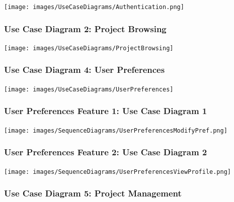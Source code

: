 \documentclass[twoside,letterpaper]{article}
\begin{document}
	\texttt{[image: images/UseCaseDiagrams/Authentication.png]}
	\newpage


	\subsubsection[Use Case Diagram 2: Project Browsing]{\rmfamily\bfseries\color{black}
	Use Case Diagram 2: Project Browsing}
	
	\texttt{[image: images/UseCaseDiagrams/ProjectBrowsing]}
	
	\newpage


	\subsubsection[Use Case Diagram 4: User Preferences]{\rmfamily\bfseries\color{black}
		Use Case Diagram 4: User Preferences}
	
	\bigskip
	
	\texttt{[image: images/UseCaseDiagrams/UserPreferences]}
	
	\newpage
	
	\subsubsection[User Preferences Feature 1: Use Case Diagram 1]{\rmfamily\bfseries\color{black}
		User Preferences Feature 1: Use Case Diagram 1}
	\hypertarget{RefHeading22059017292}{}
	\bigskip
	
	\texttt{[image: images/SequenceDiagrams/UserPreferencesModifyPref.png]}
	
	\newpage
	
	\subsubsection[User Preferences Feature 2: Use Case Diagram 2]{\rmfamily\bfseries\color{black}
		User Preferences Feature 2: Use Case Diagram 2}
	\hypertarget{RefHeading22059017292}{}
	\bigskip
	
	\texttt{[image: images/SequenceDiagrams/UserPreferencesViewProfile.png]}
	
	\newpage
	
	
	\subsubsection[Use Case Diagram 5: Project Management (dani2918)]{\rmfamily\bfseries\color{black}
		Use Case Diagram 5: Project Management}
	
\end{document}
